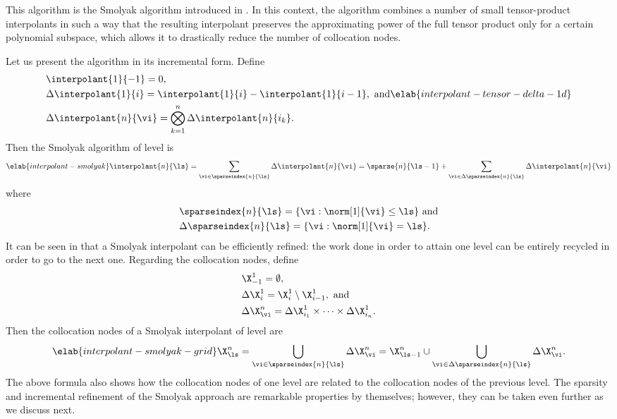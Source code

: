 This algorithm is the Smolyak algorithm introduced in .
In this context, the algorithm combines a number of small tensor-product
interpolants in such a way that the resulting interpolant preserves the
approximating power of the full tensor product only for a certain polynomial
subspace, which allows it to drastically reduce the number of collocation nodes.

Let us present the algorithm in its incremental form. Define
\begin{align}
  & \interpolant{1}{-1} = 0, \nonumber \\
  & \Delta\interpolant{1}{i} = \interpolant{1}{i} - \interpolant{1}{i - 1}, \text{ and} \elab{interpolant-tensor-delta-1d} \\
  & \Delta\interpolant{n}{\vi} = \bigotimes_{k = 1}^n \Delta\interpolant{n}{i_k}. \nonumber
\end{align}
Then the Smolyak algorithm of level \ls is
\begin{equation} \elab{interpolant-smolyak}
  \interpolant{n}{\ls}
  = \sum_{\vi \in \sparseindex{n}{\ls}} \Delta\interpolant{n}{\vi}
  = \sparse{n}{\ls - 1} + \sum_{\vi \in \Delta\sparseindex{n}{\ls}} \Delta\interpolant{n}{\vi}
\end{equation}
where
\begin{align*}
  & \sparseindex{n}{\ls} = \{ \vi: \norm[1]{\vi} \leq \ls \} \text{ and} \\
  & \Delta\sparseindex{n}{\ls} = \{ \vi: \norm[1]{\vi} = \ls \}.
\end{align*}
It can be seen in  that a Smolyak interpolant can be
efficiently refined: the work done in order to attain one level can be entirely
recycled in order to go to the next one. Regarding the collocation nodes, define
\begin{align*}
  & \X^1_{-1} = \emptyset, \\
  & \Delta\X^1_i = \X^1_i \setminus \X^1_{i - 1}, \text{ and } \\
  & \Delta\X^n_{\vi} = \Delta\X^1_{i_1} \times \cdots \times \Delta\X^1_{i_n}.
\end{align*}
Then the collocation nodes of a Smolyak interpolant of level \ls are
\begin{equation} \elab{interpolant-smolyak-grid}
  \X^n_{\ls}
  = \bigcup_{\vi \in \sparseindex{n}{\ls}} \Delta\X^n_{\vi}
  = \X^n_{\ls - 1} \cup \bigcup_{\vi \in \Delta\sparseindex{n}{\ls}} \Delta\X^n_{\vi}.
\end{equation}
The above formula also shows how the collocation nodes of one level are related
to the collocation nodes of the previous level. The sparsity and incremental
refinement of the Smolyak approach are remarkable properties by themselves;
however, they can be taken even further as we discuss next.

